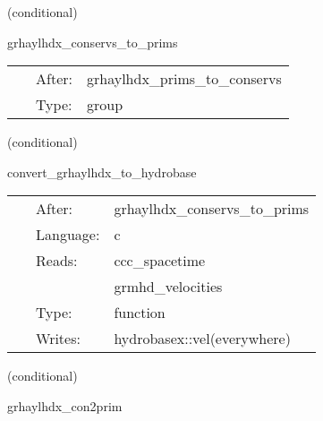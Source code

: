 \documentclass{article}
\begin{document}
\vspace{5mm}

   (conditional) 

\hspace{5mm} grhaylhdx\_conservs\_to\_prims 

\hspace{5mm}{\it compute primitive variables from conservatives } 


\hspace{5mm}

 \begin{tabular*}{160mm}{cll} 
~ & After:  & grhaylhdx\_prims\_to\_conservs \\ 
~ & Type:  & group \\ 
\end{tabular*} 


\vspace{5mm}

   (conditional) 

\hspace{5mm} convert\_grhaylhdx\_to\_hydrobase 

\hspace{5mm}{\it convert grhaylhdx variables to hydrobasex } 


\hspace{5mm}

 \begin{tabular*}{160mm}{cll} 
~ & After:  & grhaylhdx\_conservs\_to\_prims \\ 
~ & Language:  & c \\ 
~ & Reads:  & ccc\_spacetime \\ 
~& ~ &grmhd\_velocities\\ 
~ & Type:  & function \\ 
~ & Writes:  & hydrobasex::vel(everywhere) \\ 
\end{tabular*} 


\vspace{5mm}

   (conditional) 

\hspace{5mm} grhaylhdx\_con2prim 

\hspace{5mm}{\it compute primitive variables from conservatives } 


\hspace{5mm}
\end{document}
